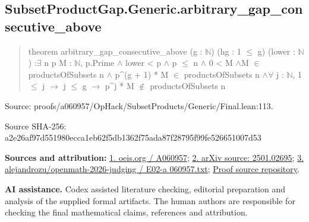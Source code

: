 \documentclass[11pt,a4paper]{article}
\begin{document}
\begin{samepage}
\subsection{SubsetProductGap.Generic.arbitrary\_gap\_consecutive\_above}
\begin{quote}\small\ttfamily theorem arbitrary\_gap\_consecutive\_above (g : \ensuremath{\mathbb{N}}) (hg : 1 \ensuremath{\leq} g) (lower : \ensuremath{\mathbb{N}}) :\newline     \ensuremath{\exists} n p M : \ensuremath{\mathbb{N}}, p.Prime \ensuremath{\wedge} lower < p \ensuremath{\wedge} p \ensuremath{\leq} n \ensuremath{\wedge} 0 < M \ensuremath{\wedge}\newline       M \ensuremath{\in} productsOfSubsets n \ensuremath{\wedge} p\textasciicircum{}(g + 1) * M \ensuremath{\in} productsOfSubsets n \ensuremath{\wedge}\newline         \ensuremath{\forall} j : \ensuremath{\mathbb{N}}, 1 \ensuremath{\leq} j \ensuremath{\to} j \ensuremath{\leq} g \ensuremath{\to} p\textasciicircum{}j * M \ensuremath{\notin} productsOfSubsets n\end{quote}
{\small Source: proofs/a060957/OpHack/SubsetProducts/Generic/Final.lean:113.\par}

{\small Source SHA-256: a2e26af97d551980ecca1eb62f5db1362f75ada87f28795f99fe526651007d53\par}

{\small\textbf{Sources and attribution:} \href{https://oeis.org/A060957}{1. oeis.org / A060957}; \href{https://arxiv.org/abs/2501.02695}{2. arXiv source: 2501.02695}; \href{https://github.com/alejandrozu/openmath-2026-judging/blob/d0ed487f487fa7ec814ff705ab55249983fe8707/OpenMath-Judging/review/entries/E02-a060957.txt}{3. alejandrozu/openmath-2026-judging / E02-a 060957.txt}; \href{https://github.com/alejandrozu/openmath-2026-judging}{Proof source repository}.\par}

\end{samepage}
{\small \textbf{AI assistance.} Codex assisted literature checking, editorial preparation and analysis of the supplied formal artifacts. The human authors are responsible for checking the final mathematical claims, references and attribution.\par}
\end{document}
